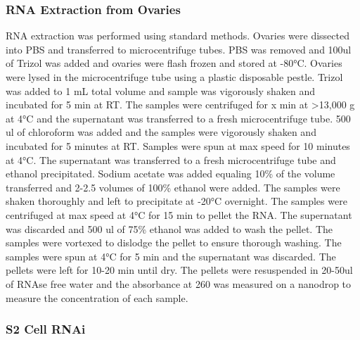 \documentclass[12pt,oneside]{reedthesis}
\begin{document}
\hypertarget{rna-extraction-from-ovaries}{%
\subsubsection{RNA Extraction from Ovaries}\label{rna-extraction-from-ovaries}}

RNA extraction was performed using standard methods. Ovaries were dissected into PBS and transferred to microcentrifuge tubes. PBS was removed and 100ul of Trizol was added and ovaries were flash frozen and stored at -80°C. Ovaries were lysed in the microcentrifuge tube using a plastic disposable pestle. Trizol was added to 1 mL total volume and sample was vigorously shaken and incubated for 5 min at RT. The samples were centrifuged for x min at \textgreater13,000 g at 4°C and the supernatant was transferred to a fresh microcentrifuge tube. 500 ul of chloroform was added and the samples were vigorously shaken and incubated for 5 minutes at RT. Samples were spun at max speed for 10 minutes at 4°C. The supernatant was transferred to a fresh microcentrifuge tube and ethanol precipitated. Sodium acetate was added equaling 10\% of the volume transferred and 2-2.5 volumes of 100\% ethanol were added. The samples were shaken thoroughly and left to precipitate at -20°C overnight. The samples were centrifuged at max speed at 4°C for 15 min to pellet the RNA. The supernatant was discarded and 500 ul of 75\% ethanol was added to wash the pellet. The samples were vortexed to dislodge the pellet to ensure thorough washing. The samples were spun at 4°C for 5 min and the supernatant was discarded. The pellets were left for 10-20 min until dry. The pellets were resuspended in 20-50ul of RNAse free water and the absorbance at 260 was measured on a nanodrop to measure the concentration of each sample.

\hypertarget{s2-cell-rnai}{%
\subsubsection{S2 Cell RNAi}\label{s2-cell-rnai}}
\end{document}
